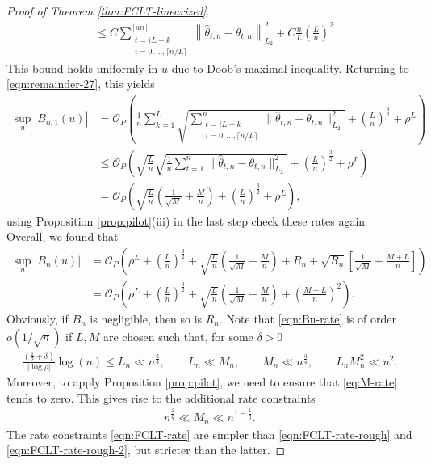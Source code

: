 \documentclass[10pt, a4paper]{article}
\theoremstyle{assumption}
\theoremstyle{definition}
\theoremstyle{theorem}
\begin{document}
\begin{proof}[Proof of Theorem \ref{thm:FCLT-linearized}]
\begin{align*}
        &\leq C \sum_{\substack{t=iL+k\\ i=0,\ldots, \lceil n/L\rceil}}^{\lfloor un\rfloor}  \left\|\widehat{\theta}_{t,n}-\theta_{t,n}\right\|_{L_2}^2 + C \tfrac{n}{L}\left(\tfrac{L}{n}\right)^2
    \end{align*}
    This bound holds uniformly in $u$ due to Doob's maximal inequality.
    Returning to \eqref{eqn:remainder-27}, this yields
    \begin{align*}
        \sup_u |B_{n,1}(u)| 
        &= \mathcal{O}_P\left( \frac{1}{n} \sum_{k=1}^L \sqrt{ \sum_{\substack{t=iL+k\\ i=0,\ldots, \lceil n/L\rceil}}^{n} \|\widehat{\theta}_{t,n} - \theta_{t,n}\|_{L_2}^2} +(\tfrac{L}{n})^{\frac{3}{2}}+ \rho^L \right) \\
        &\leq  \mathcal{O}_P\left( \sqrt{\tfrac{L}{n}} \sqrt{\frac{1}{n} \sum_{t=1}^n \|\widehat{\theta}_{t,n} - \theta_{t,n}\|_{L_2}^2} +(\tfrac{L}{n})^{\frac{3}{2}}+ \rho^L \right) \\
        &= \mathcal{O}_P\left( \sqrt{\tfrac{L}{n}} \left(\tfrac{1}{\sqrt{M}} + \tfrac{M}{n} \right) +(\tfrac{L}{n})^{\frac{3}{2}}+ \rho^L \right),
    \end{align*}
    using Proposition \ref{prop:pilot}(iii) in the last step
    \color{blue} check these rates again \color{black}\\
    Overall, we found that
    \begin{align}
        \sup_{u} |B_n(u)| 
        &=\mathcal{O}_P\left(\rho^L + (\tfrac{L}{n})^{\frac{3}{2}}     + \sqrt{\tfrac{L}{n}} \left(\tfrac{1}{\sqrt{M}} + \tfrac{M}{n} \right) +  R_n + \sqrt{R_n} \left[\frac{1}{\sqrt{M}} + \frac{M+L}{n}\right]  \right) \nonumber \\
        &= \mathcal{O}_P\left( \rho^L + (\tfrac{L}{n})^{\frac{3}{2}}     + \sqrt{\tfrac{L}{n}} \left(\tfrac{1}{\sqrt{M}} + \tfrac{M}{n} \right) + \left(\frac{M+L}{n}\right)^2 \right) . \label{eqn:Bn-rate} 
    \end{align}
    Obviously, if $B_n$ is negligible, then so is $R_n$. 
    Note that \eqref{eqn:Bn-rate} is of order $o(1/\sqrt{n})$ if $L, M$ are chosen such that, for some $\delta>0$
    \begin{align}
        \frac{\left(\frac{1}{2}+\delta \right)}{|\log \rho|} \log(n) \leq L_n \ll n^{\frac{2}{3}}, \qquad L_n \ll M_n,\qquad M_n \ll n^{\frac{3}{4}}, \qquad L_n M_n^2 \ll n^2.\label{eqn:FCLT-rate-rough}
    \end{align}
    Moreover, to apply Proposition \ref{prop:pilot}, we need to ensure that \eqref{eq:M-rate} tends to zero. 
    This gives rise to the additional rate constraints
    \begin{align}
       n^{\frac{2}{q}} \ll M_n \ll n^{1-\frac{1}{q}}. \label{eqn:FCLT-rate-rough-2}
    \end{align}
    The rate constraints \eqref{eqn:FCLT-rate} are simpler than \eqref{eqn:FCLT-rate-rough} and \eqref{eqn:FCLT-rate-rough-2}, but stricter than the latter.


\end{proof}
\end{document}
